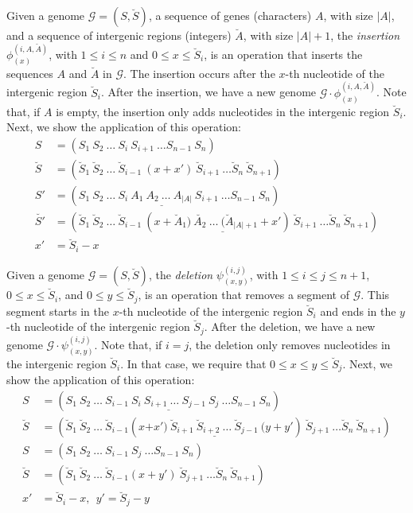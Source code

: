 \documentclass[12pt]{article}
\begin{document}
Given a genome $\mathcal{G} = (S,\breve{S})$, a sequence of genes (characters) $A$, with size $|A|$, and a sequence of intergenic regions (integers) $\breve{A}$, with size $|A| + 1$, the \emph{insertion} $\phi^{(i,A,\breve{A})}_{(x)}$, with $1 \le i \le n$ and $0 \le x \le \breve{S}_{i}$, is an operation that inserts the sequences $A$ and $\breve{A}$ in $\mathcal{G}$. The insertion occurs after the $x$-th nucleotide of the intergenic region $\breve{S}_i$. After the insertion, we have a new genome $\mathcal{G} \cdot \phi^{(i,A,\breve{A})}_{(x)}$. Note that, if $A$ is empty, the insertion only adds nucleotides in the intergenic region $\breve{S}_i$. Next, we show the application of this operation:
\begin{align*}
    S &= (S_1~S_2~\ldots~S_i~S_{i+1}~\ldots S_{n-1}~S_n)\\
    \breve{S} &= (\breve{S}_1~\breve{S}_2~\ldots~\breve{S}_{i-1}~(x+x')~\breve{S}_{i+1}~\ldots \breve{S}_{n}~\breve{S}_{n+1})\\
    S' &= (S_1~S_2~\ldots~S_i~\underline{A_1~A_2~\ldots~A_{|A|}}~S_{i+1}~\ldots S_{n-1}~S_n)\\
    \breve{S'} &= (\breve{S}_1~\breve{S}_2~\ldots~\breve{S}_{i-1}~(x+\underline{\breve{A}_1)~\breve{A_2}~\ldots~(\breve{A}_{|A|+1}+}x')~\breve{S}_{i+1}~\ldots \breve{S}_{n}~\breve{S}_{n+1})\\
    x'&= \breve{S}_i - x
\end{align*}

Given a genome $\mathcal{G} = (S,\breve{S})$, the \emph{deletion} $\psi^{(i,j)}_{(x,y)}$, with $1 \le i \le j \le n + 1$, $0 \le x \le \breve{S}_{i}$, and $0 \le y \le \breve{S}_{j}$, is an operation that removes a segment of $\mathcal{G}$. This segment starts in the $x$-th nucleotide of the intergenic region $\breve{S}_i$ and ends in the $y$-th nucleotide of the intergenic region $\breve{S}_{j}$. After the deletion, we have a new genome $\mathcal{G} \cdot \psi^{(i,j)}_{(x,y)}$. Note that, if $i=j$, the deletion only removes nucleotides in the intergenic region $\breve{S}_i$. In that case, we require that $0 \le x \le y \le \breve{S}_j$. Next, we show the application of this operation:
\begin{align*}
    S &= (S_1~S_2~\ldots~S_{i-1}~\underline{S_i~S_{i+1}~\ldots~S_{j-1}}~S_j~\ldots S_{n-1}~S_n)\\
    \breve{S} &= (\breve{S}_1~\breve{S}_2~\ldots~\breve{S}_{i-1}(x\underline{+x')~\breve{S}_{i+1}~\breve{S}_{i+2}~\ldots~\breve{S}_{j-1}~(y+}y')~\breve{S}_{j+1}~\ldots \breve{S}_{n}~\breve{S}_{n+1})\\
    S &= (S_1~S_2~\ldots~S_{i-1}~S_j~\ldots S_{n-1}~S_n)\\
    \breve{S} &= (\breve{S}_1~\breve{S}_2~\ldots~\breve{S}_{i-1}(x+y')~\breve{S}_{j+1}~\ldots \breve{S}_{n}~\breve{S}_{n+1})\\
    x'&= \breve{S}_i - x,~~ y' = \breve{S}_{j} - y
\end{align*}
\end{document}
